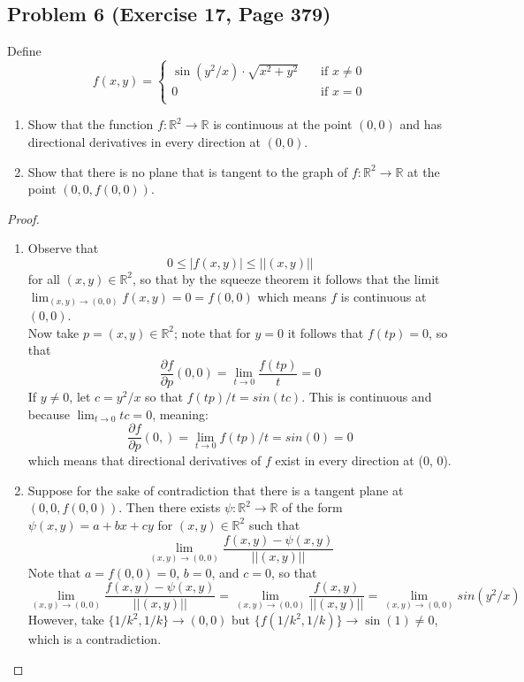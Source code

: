 \documentclass{article}
\begin{document}
\subsection*{Problem 6 (Exercise 17, Page 379)}
Define 
\[ f(x, y) = \begin{cases}
          \sin(y^2/x) \cdot \sqrt{x^2+y^2} \quad &\text{if $x \neq 0$} \\
          0 \quad &\text{if $x = 0$}\\
          \end{cases}\]
\begin{enumerate}[label=\alph*.]
    \item Show that the function $f \colon \mathbb{R}^2 \to \mathbb{R}$ is continuous at the point $(0, 0)$ and has directional derivatives in every direction at $(0, 0)$. 
    \item Show that there is no plane that is tangent to the graph of $f \colon \mathbb{R}^2 \to \mathbb{R}$ at the point $(0, 0, f(0, 0)).$
\end{enumerate}
\begin{proof}
\qquad 
\begin{enumerate}[label=\alph*.]
\item Observe that 
\[ 0 \leq |f(x, y)| \leq ||(x, y)|| \]
for all $(x, y) \in \mathbb{R}^2$, so that by the squeeze theorem it follows that the limit $\lim_{(x, y) \to (0, 0)}f(x, y) = 0 = f(0, 0)$ which means $f$ is continuous at $(0, 0)$. \\
Now take $p = (x, y) \in \mathbb{R}^2$; note that for $y = 0$ it follows that $f(tp) = 0$, so that 
\[ \frac{\partial f}{\partial p}(0, 0) = \lim_{t \to 0}\frac{f(tp)}{t} = 0\]
If $y \neq 0$, let $c = y^2/x$ so that $f(tp)/t = sin(tc)$. This is continuous and because $\lim_{t \to 0}tc = 0$, meaning:
\[ \frac{\partial f}{\partial p}(0, ) = \lim_{t \to 0} f(tp)/t = sin(0) = 0\]
which means that directional derivatives of $f$ exist in every direction at (0, 0). 
\item Suppose for the sake of contradiction that there is a tangent plane at $(0, 0, f(0, 0))$. Then there exists $\psi \colon \mathbb{R}^2 \to \mathbb{R}$ of the form $\psi(x, y) = a + bx + cy$ for $(x, y) \in \mathbb{R}^2$ such that 
\[ \lim_{(x, y) \to (0, 0)} \frac{f(x, y) - \psi(x, y)}{||(x, y)||}\]
Note that $a = f(0, 0) = 0$, $b = 0$, and $c = 0$, so that
\[ \lim_{(x, y) \to (0, 0)} \frac{f(x, y) - \psi(x, y)}{||(x, y)||} = \lim_{(x, y) \to (0, 0)} \frac{f(x, y)}{||(x, y)||} = \lim_{(x, y) \to (0, 0)} sin(y^2/x)\]
However, take $\{1/k^2, 1/k\} \to (0, 0)$ but $\{f(1/k^2, 1/k)\} \to \sin(1) \neq 0$, which is a contradiction. 
\end{enumerate}
\end{proof}
\end{document}
